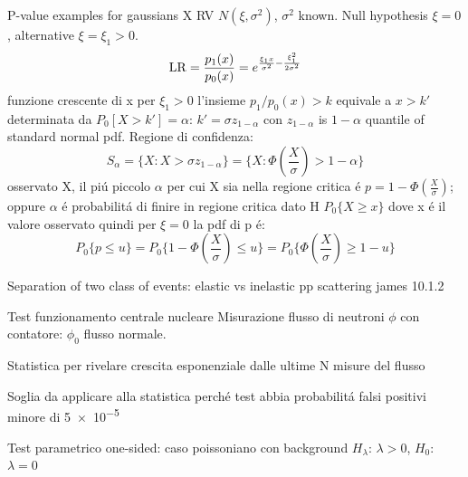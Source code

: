 \documentclass[asd-beamer.tex]{subfiles}
\begin{document}
\begin{wordonframe}{P-value examples for gaussians}
	X RV $N(\xi,\sigma^2)$, $\sigma^2$ known. Null hypothesis $\xi=0$, alternative $\xi=\xi_1>0$.
	\begin{equation*}
	\operatorname{LR}=\frac{p_1(x)}{p_0(x)}=e^{\frac{\xi_1x}{\sigma^2}-\frac{\xi_1^2}{2\sigma^2}}
	\end{equation*}
	funzione crescente di x per $\xi_1>0$ l'insieme $p_1/p_0(x)>k$ equivale a $x>k'$ determinata da $P_0[X>k']=\alpha$: $k'=\sigma z_{1-\alpha}$ con $z_{1-\alpha}$ is $1-\alpha$ quantile of standard normal pdf.
	Regione di confidenza:
	\begin{equation*}
	S_{\alpha}=\{X: X>\sigma z_{1-\alpha}\}=\{X: \Phi(\frac{X}{\sigma})>1-\alpha\}
	\end{equation*}
	osservato X, il pi\'u piccolo $\alpha$ per cui X sia nella regione critica \'e $p=1-\Phi(\frac{X}{\sigma})$; oppure $\alpha$ \'e probabilit\'a di finire in regione critica dato H $P_0\{X\geq x\}$ dove x \'e il valore osservato quindi per $\xi=0$ la pdf di p \'e:
	\begin{equation*}
	P_0\{p\leq u\}=P_0\{1-\Phi(\frac{X}{\sigma})\leq u\}=P_0\{\Phi(\frac{X}{\sigma})\geq 1-u\}
	\end{equation*}
\end{wordonframe}

\begin{frame}{Separation of two class of events: elastic vs inelastic pp scattering}
james 10.1.2
\end{frame}

\begin{frame}{Test funzionamento centrale nucleare}\frameintoc
Misurazione flusso di neutroni $\phi$ con contatore: $\phi_0$ flusso normale.
\begin{block}{Statistica per rivelare crescita esponenziale dalle ultime N misure del flusso}

\end{block}
\begin{block}{Soglia da applicare alla statistica perch\'e test abbia probabilit\'a falsi positivi minore di \num{5e-5}}

\end{block}
\end{frame}

\begin{frame}{Test parametrico one-sided: caso poissoniano con background}
$H_{\lambda}$: $\lambda>0$, $H_0$: $\lambda=0$
\end{frame}
\end{document}
